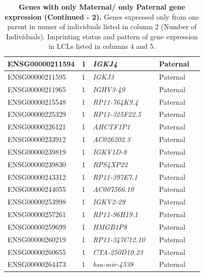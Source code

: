 \begin{table}
\begin{adjustbox}{width={\textwidth}}
\begin{tabular}{@{}p{4cm}p{3cm}p{3cm}p{3cm}p{3cm}p{3cm}@{}}
ENSG00000211594 & 1 & \emph{IGKJ4} & &  Paternal &   \\ \hline
ENSG00000211595 & 1 & \emph{IGKJ3} & &  Paternal &   \\ \hline
ENSG00000211965 & 1 & \emph{IGHV3-49} & & Paternal &   \\ \hline
ENSG00000215548 & 1 & \emph{RP11-764K9.4} & &  Paternal &   \\ \hline
ENSG00000225329 & 1 & \emph{RP11-325F22.5} & &  Paternal &   \\ \hline
ENSG00000226121 & 1 & \emph{AHCTF1P1} & &  Paternal &   \\ \hline
ENSG00000233912 & 1 & \emph{AC026202.3} & &  Paternal &   \\ \hline
ENSG00000239819 & 1 & \emph{IGKV1D-8} & &  Paternal &   \\ \hline
ENSG00000239830 & 1 & \emph{RPS4XP22} & &  Paternal &   \\ \hline
ENSG00000243312 & 1 & \emph{RP11-397E7.1}& &  Paternal &   \\ \hline
ENSG00000244055 & 1 & \emph{AC007566.10} & &  Paternal &   \\ \hline
ENSG00000253998 & 1 & \emph{IGKV2-29} & &  Paternal &   \\ \hline
ENSG00000257261 & 1 & \emph{RP11-96H19.1} & &  Paternal &   \\ \hline
ENSG00000259699 & 1 & \emph{HMGB1P8} & &  Paternal &   \\ \hline
ENSG00000260219 & 1 & \emph{RP11-347C12.10} & &  Paternal &  \\ \hline
ENSG00000260655 & 1 & \emph{CTA-250D10.23} & & Paternal &  \\ \hline
ENSG00000264473 & 1 & \emph{hsa-mir-4538} & &  Paternal &  \\ \hline
\end{tabular}
\end{adjustbox}
\caption[Genes with only Maternal/ only Paternal gene expression (Continued - 2). ]{\textbf{Genes with only Maternal/ only Paternal gene expression (Continued - 2).  }Genes expressed only from one parent in numer of individuals listed in column 2 (Number of Individuals). Imprinting status and pattern of gene expression in LCLs listed in columns 4 and 5.}
\label{tab:oneparentexpression3}
\end{table}


